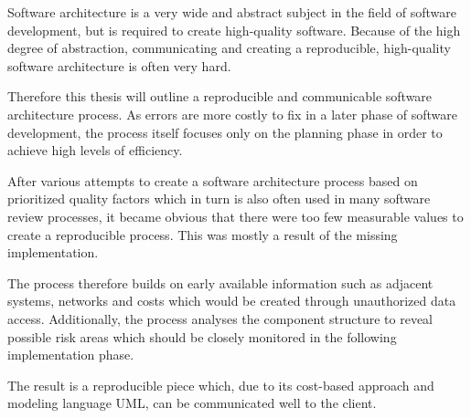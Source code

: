 Software architecture is a very wide and abstract subject in the field of software development, but is required to create high-quality software. Because of the high degree of abstraction, communicating and creating a reproducible, high-quality software architecture is often very hard.

Therefore this thesis will outline a reproducible and communicable software architecture process. As errors are more costly to fix in a later phase of software development, the process itself focuses only on the planning phase in order to achieve high levels of efficiency.

After various attempts to create a software architecture process based on prioritized quality factors which in turn is also often used in many software review processes, it became obvious that there were too few measurable values to create a reproducible process. This was mostly a result of the missing implementation.

The process therefore builds on early available information such as adjacent systems, networks and costs which would be created through unauthorized data access. Additionally, the process analyses the component structure to reveal possible risk areas which should be closely monitored in the following implementation phase.

The result is a reproducible piece which, due to its cost-based approach and modeling language UML, can be communicated well to the client.